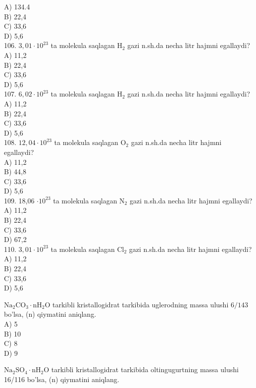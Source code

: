 A) 134.4\\
B) 22,4\\
C) 33,6\\
D) 5,6\\
106. $3,01 \cdot 10^{23}$ ta molekula saqlagan $\mathrm{H}_{2}$ gazi n.sh.da necha litr hajmni egallaydi?\\
A) 11,2\\
B) 22,4\\
C) 33,6\\
D) 5,6\\
107. $6,02 \cdot 10^{23}$ ta molekula saqlagan $\mathrm{H}_{2}$ gazi n.sh.da necha litr hajmni egallaydi?\\
A) 11,2\\
B) 22,4\\
C) 33,6\\
D) 5,6\\
108. $12,04 \cdot 10^{23}$ ta molekula saqlagan $\mathrm{O}_{2}$ gazi n.sh.da necha litr hajmni egallaydi?\\
A) 11,2\\
B) 44,8\\
C) 33,6\\
D) 5,6\\
109. 18,06 $\cdot 10^{23}$ ta molekula saqlagan $\mathrm{N}_{2}$ gazi n.sh.da necha litr hajmni egallaydi?\\
A) 11,2\\
B) 22,4\\
C) 33,6\\
D) 67,2\\
110. $3,01 \cdot 10^{23}$ ta molekula saqlagan $\mathrm{Cl}_{2}$ gazi n.sh.da necha litr hajmni egallaydi?\\
A) 11,2\\
B) 22,4\\
C) 33,6\\
D) 5,6
  \item $\mathrm{Na}_{2} \mathrm{CO}_{3} \cdot \mathrm{nH}_{2} \mathrm{O}$ tarkibli kristallogidrat tarkibida uglerodning massa ulushi $6 / 143$ bo'lsa, (n) qiymatini aniqlang.\\
A) 5\\
B) 10\\
C) 8\\
D) 9\\
  \item $\mathrm{Na}_{2} \mathrm{SO}_{4} \cdot \mathrm{nH}_{2} \mathrm{O}$ tarkibli kristallogidrat tarkibida oltingugurtning massa ulushi 16/116 bo'lsa, (n) qiymatini aniqlang.\\
